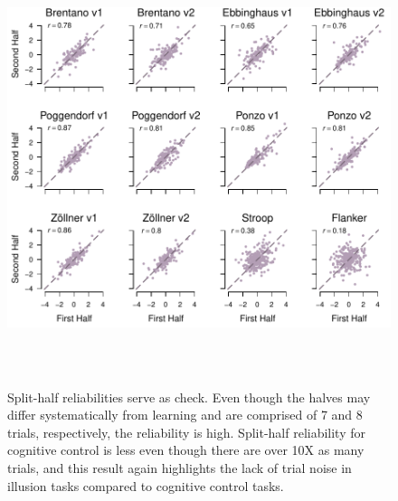 \documentclass[man, 12pt]{apa7} %
\begin{document}
\begin{figure}
    \centering  %
    \includegraphics[width=6in, height=5in]{_figs/split-halves.pdf}
    \caption{Split-half reliabilities serve as check.  Even though the halves may differ systematically from learning and are comprised of 7 and 8 trials, respectively, the reliability is high.  Split-half reliability for cognitive control is less even though there are over 10X as many trials, and this result again highlights the lack of trial noise in illusion tasks compared to cognitive control tasks.}
    \label{fig:relPlots}
\end{figure}
\end{document}

